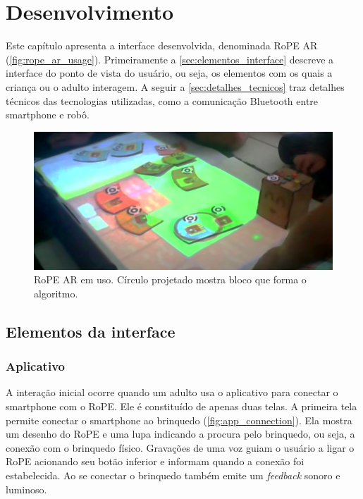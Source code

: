 \chapter{Desenvolvimento}
\label{c_desenvolvimento}

Este capítulo apresenta a interface desenvolvida, denominada RoPE AR (\autoref{fig:rope_ar_usage}). Primeiramente a \autoref{sec:elementos_interface} descreve a interface do ponto de vista do usuário, ou seja, os elementos com os quais a criança ou o adulto interagem. A seguir a \autoref{sec:detalhes_tecnicos} traz detalhes técnicos das tecnologias utilizadas, como a comunicação Bluetooth entre smartphone e robô.

\begin{figure}[!h]
    \centering
    \includegraphics[width=0.7\linewidth,fbox]{figs/wide_interface.png}
    \caption{RoPE AR em uso. Círculo projetado mostra bloco que forma o algoritmo. }
    \label{fig:rope_ar_usage}
    \sourceauthor
\end{figure}

\section{Elementos da interface}
\label{sec:elementos_interface}
\subsection{Aplicativo}
A interação inicial ocorre quando um adulto usa o aplicativo para conectar o smartphone com o RoPE. Ele é constituído de apenas duas telas. A primeira tela permite conectar o smartphone ao brinquedo (\autoref{fig:app_connection}). Ela mostra um desenho do RoPE e uma lupa indicando a procura pelo brinquedo, ou seja, a conexão com o brinquedo físico. Gravações de uma voz guiam o usuário a ligar o RoPE acionando seu botão inferior e informam quando a conexão foi estabelecida. Ao se conectar o brinquedo também emite um \textit{feedback} sonoro e luminoso.

